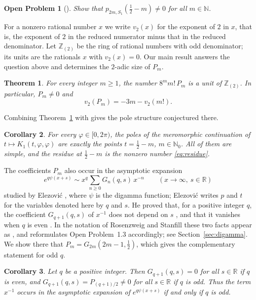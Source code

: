\documentclass[11pt]{amsart}
\newtheorem{theorem}{Theorem}[section]
\newtheorem{corollary}[theorem]{Corollary}
\newtheorem*{problem}{Open Problem}
\theoremstyle{definition}
\theoremstyle{remark}
\numberwithin{equation}{section}
\newcommand{\N}{\mathbb{N}}
\newcommand{\Z}{\mathbb{Z}}
\newcommand{\Zt}{\Z_{(2)}}
\begin{document}
\begin{problem}[{\cite[Open Problem~1.3]{RS}}]
Show that $p_{2m,S_1}(\frac12-m)\ne0$ for all $m\in\N$.
\end{problem}

For a nonzero rational number $x$ we write $v_2(x)$ for the exponent of $2$ in $x$, that is, the exponent of $2$ in the reduced numerator minus that in the reduced denominator. Let $\Zt$ be the ring of rational numbers with odd denominator; its units are the rationals $x$ with $v_2(x)=0$. Our main result answers the question above and determines the $2$-adic size of $P_m$.

\begin{theorem}\label{thm:main}
For every integer $m\ge1$, the number $8^m m!\,P_m$ is a unit of $\Zt$. In particular, $P_m\ne0$ and
\[
  v_2(P_m)=-3m-v_2(m!).
\]
\end{theorem}

Combining Theorem~\ref{thm:main} with \cite[Theorem~1.2]{RS} gives the pole structure conjectured there.

\begin{corollary}\label{cor:poles}
For every $\varphi\in[0,2\pi)$, the poles of the meromorphic continuation of $t\mapsto K_1(t,\varphi,\varphi)$ are exactly the points $t=\frac12-m$, $m\in\N_0$. All of them are simple, and the residue at $\frac12-m$ is the nonzero number \eqref{eq:residue}.
\end{corollary}

The coefficients $P_m$ also occur in the asymptotic expansion
\[
  e^{q\psi(x+s)}\sim x^q\sum_{n\ge0}G_n(q,s)\,x^{-n}\qquad(x\to\infty,\ s\in\mathbb{R})
\]
studied by Elezovi\'c \cite{E}, where $\psi$ is the digamma function; Elezovi\'c writes $p$ and $t$ for the variables denoted here by $q$ and $s$. He proved that, for a positive integer $q$, the coefficient $G_{q+1}(q,s)$ of $x^{-1}$ does not depend on $s$ \cite[Theorem~3.1]{E}, and that it vanishes when $q$ is even \cite[Theorem~3.2]{E}. In the notation of Rosenzweig and Stanfill these two facts appear as \cite[Proposition~2.4 and Corollary~2.5]{RS}, and \cite[Remark~2.7]{RS} reformulates Open Problem~1.3 accordingly; see Section~\ref{sec:digamma}. We show there that \mbox{$P_m=G_{2m}(2m-1,\frac12)$}, which gives the complementary statement for odd $q$.

\begin{corollary}\label{cor:digamma}
Let $q$ be a positive integer. Then $G_{q+1}(q,s)=0$ for all $s\in\mathbb{R}$ if $q$ is even, and $G_{q+1}(q,s)=P_{(q+1)/2}\ne0$ for all $s\in\mathbb{R}$ if $q$ is odd. Thus the term $x^{-1}$ occurs in the asymptotic expansion of $e^{q\psi(x+s)}$ if and only if $q$ is odd.
\end{corollary}
\end{document}
